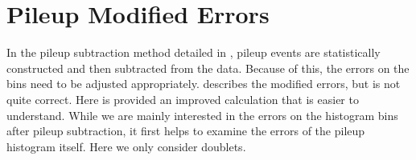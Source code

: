 
\thispagestyle{myheadings}

\chapter{Pileup Modified Errors}
\label{app:PileupErrors}

In the pileup subtraction method detailed in , pileup events are statistically constructed and then subtracted from the data. Because of this, the errors on the bins need to be adjusted appropriately.  describes the modified errors, but is not quite correct. Here is provided an improved calculation that is easier to understand. While we are mainly interested in the errors on the histogram bins after pileup subtraction, it first helps to examine the errors of the pileup histogram itself. Here we only consider doublets.

